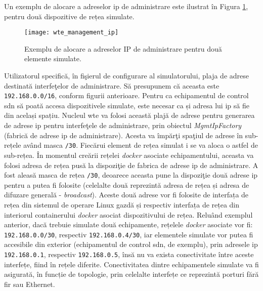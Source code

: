 Un exemplu de alocare a adreselor \gls{ip} de administrare este ilustrat în Figura \ref{fig:wte_management_ip}, pentru două dispozitive de rețea simulate.

\begin{figure}[h]
	\centering
	\texttt{[image: wte\_management\_ip]}
	\caption{Exemplu de alocare a adreselor IP de administrare pentru două elemente simulate.}
	\label{fig:wte_management_ip}
\end{figure}

Utilizatorul specifică, în fişierul de configurare al simulatorului, plaja de adrese destinată interfeţelor de administrare. Să presupunem că aceasta este \texttt{192.168.0.0/16}, conform figurii anterioare. Pentru ca echipamentul de control \gls{sdn} să poată accesa dispozitivele simulate, este necesar ca și adresa lui \gls{ip} să fie din același spațiu. Nucleul \gls{wte} va folosi această plajă de adrese pentru generarea de adrese \gls{ip} pentru interfeţele de administrare, prin obiectul \textit{MgmtIpFactory} (fabrică de adrese \gls{ip} de administrare). Acesta va împărţi spaţiul de adrese în sub-rețele având masca \texttt{/30}. Fiecărui element de rețea simulat i se va aloca o astfel de sub-rețea. În momentul creării rețelei \textit{docker} asociate echipamentului, aceasta va folosi adresa de rețea pusă la dispoziţie de fabrica de adrese \gls{ip} de administrare. A fost aleasă masca de rețea \texttt{/30}, deoarece aceasta pune la dispoziţie două adrese \gls{ip} pentru a putea fi folosite (celelalte două reprezintă adresa de rețea și adresa de difuzare generală - \textit{broadcast}). Aceste două adrese vor fi folosite de interfața de rețea din sistemul de operare Linux gazdă și respectiv interfața de rețea din interiorul containerului \textit{docker} asociat dispozitivului de rețea. Reluând exemplul anterior, dacă trebuie simulate două echipamente, rețelele \textit{docker} asociate vor fi: \texttt{192.168.0.0/30}, respectiv \texttt{192.168.0.4/30}, iar elementele simulate vor putea fi accesibile din exterior (echipamentul de control \gls{sdn}, de exemplu), prin adresele \gls{ip} \texttt{192.168.0.1}, respectiv \texttt{192.168.0.5}, însă nu va exista conectivitate între aceste interfețe, fiind în rețele diferite. Conectivitatea dintre echipamentele simulate va fi asigurată, în funcție de topologie, prin celelalte interfețe ce reprezintă porturi fără fir sau Ethernet.